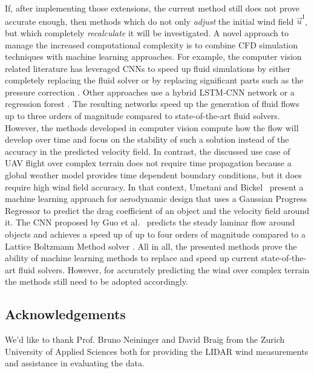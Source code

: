 \documentclass[twocolumn,letterpaper]{IEEEAerospaceCLS}
\begin{document}
If, after implementing those extensions, the current method still does not prove accurate enough, then methods which do not only \emph{adjust} the initial wind field $\vec{u}^\text{I}$, but which completely \emph{recalculate} it will be investigated. A novel approach to manage the increased computational complexity is to combine \ac{CFD} simulation techniques with machine learning approaches. For example, the computer vision related literature has leveraged \acp{CNN} to speed up fluid simulations by either completely replacing the fluid solver \cite{Kim2018DeepFluids} or by replacing significant parts such as the pressure correction \cite{Tompson2017AEF}. Other approaches use a hybrid LSTM-\ac{CNN} network \cite{Wiewel2018LSP} or a regression forest \cite{Ladicky2015DFS}. The resulting networks speed up the generation of fluid flows up to three orders of magnitude compared to state-of-the-art fluid solvers. However, the methods developed in computer vision compute how the flow will develop over time and focus on the stability of such a solution instead of the accuracy in the predicted velocity field. In contrast, the discussed use case of UAV flight over complex terrain does not require time propagation because a global weather model provides time dependent boundary conditions, but it does require high wind field accuracy. In that context, Umetani and Bickel~\cite{Umetani2018LTF} present a machine learning approach for aerodynamic design that uses a Gaussian Progress Regressor to predict the drag coefficient of an object and the velocity field around it. The \ac{CNN} proposed by Guo et al.~\cite{Guo2016CNN} predicts the steady laminar flow around objects and achieves a speed up of up to four orders of magnitude compared to a Lattice Boltzmann Method solver \cite{McNamara1988LBM}. All in all, the presented methods prove the ability of machine learning methods to replace and speed up current state-of-the-art fluid solvers. However, for accurately predicting the wind over complex terrain the methods still need to be adopted accordingly.

\subsection*{Acknowledgements}
We'd like to thank Prof. Bruno Neininger and David Braig from the Zurich University of Applied Sciences both for providing the LIDAR wind measurements and assistance in evaluating the data.




\end{document}

